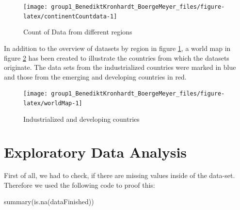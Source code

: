 \documentclass[
  11pt,
  a4paper,
  twoside]{scrbook}
\newenvironment{Shaded}{\begin{snugshade}}{\end{snugshade}}
\newcommand{\FunctionTok}[1]{\textcolor[rgb]{0.00,0.00,0.00}{#1}}
\newcommand{\NormalTok}[1]{#1}
\begin{document}
\begin{figure}

{\centering \texttt{[image: group1\_BenediktKronhardt\_BoergeMeyer\_files/figure-latex/continentCountdata-1]} 

}

\caption{Count of Data from different regions}\label{fig:continentCountdata}
\end{figure}

In addition to the overview of datasets by region in figure \ref{fig:continentCountdata}, a world map in figure \ref{fig:worldMap} has been created to illustrate the countries from which the datasets originate. The data sets from the industrialized countries were marked in blue and those from the emerging and developing countries in red.

\begin{figure}

{\centering \texttt{[image: group1\_BenediktKronhardt\_BoergeMeyer\_files/figure-latex/worldMap-1]} 

}

\caption{Industrialized and developing countries}\label{fig:worldMap}
\end{figure}

\hypertarget{exploratory-data-analysis}{%
\section{Exploratory Data Analysis}\label{exploratory-data-analysis}}

First of all, we had to check, if there are missing values inside of the data-set. Therefore we used the following code to proof this:

\linespread{1}

\begin{Shaded}
\begin{Highlighting}[]
\FunctionTok{summary}\NormalTok{(}\FunctionTok{is.na}\NormalTok{(dataFinished))}
\end{Highlighting}
\end{Shaded}

\linespread{1}
\end{document}
